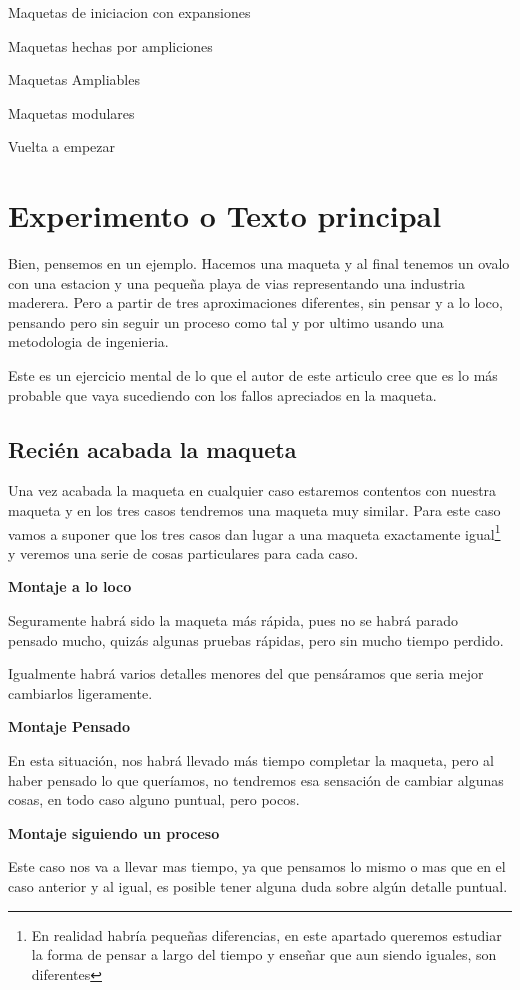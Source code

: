 Maquetas de iniciacion con expansiones

Maquetas hechas por ampliciones

Maquetas Ampliables

Maquetas modulares

Vuelta a empezar

\section{Experimento o Texto principal}
Bien, pensemos en un ejemplo. Hacemos una maqueta y al final tenemos un ovalo con una estacion
y una pequeña playa de vias representando una industria maderera. Pero a partir de tres
aproximaciones diferentes, sin pensar y a lo loco, pensando pero sin seguir un proceso como tal
y por ultimo usando una metodologia de ingenieria.

Este es un ejercicio mental de lo que el autor de este articulo cree que es lo más probable que vaya sucediendo con los fallos apreciados en la maqueta.

\subsection{Recién acabada la maqueta}
Una vez acabada la maqueta en cualquier caso estaremos contentos con nuestra maqueta y en los tres casos tendremos una maqueta muy similar. Para este caso vamos a suponer que los tres casos dan lugar a una maqueta exactamente igual\footnote{En realidad habría pequeñas diferencias, en este apartado queremos estudiar la forma de pensar a largo del tiempo y enseñar que aun siendo iguales, son diferentes} y veremos una serie de cosas particulares para cada caso.
\begin{multicols}{3}
	\textbf{Montaje a lo loco}
	
	Seguramente habrá sido la maqueta más rápida, pues no se habrá parado pensado mucho, quizás algunas pruebas rápidas, pero sin mucho tiempo perdido.
	
	Igualmente habrá varios detalles menores del que pensáramos que seria mejor cambiarlos ligeramente.
	
	\columnbreak
	
	\textbf{Montaje Pensado}
	
	En esta situación, nos habrá llevado más tiempo completar la maqueta, pero al haber pensado lo que queríamos, no tendremos esa sensación de cambiar algunas cosas, en todo caso alguno puntual, pero pocos.
	
	\columnbreak
	
	\textbf{Montaje siguiendo un proceso}
	
	Este caso nos va a llevar mas tiempo, ya que pensamos lo mismo o mas que en el caso anterior y al igual, es posible tener alguna duda sobre algún detalle puntual.
\end{multicols}

